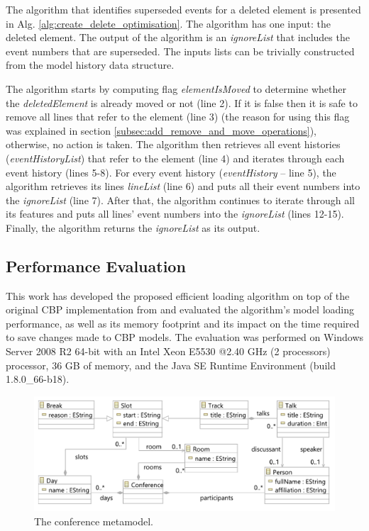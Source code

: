 \documentclass[12pt, a4paper]{report} \usepackage[titletoc]{appendix}
\begin{document}
The algorithm that identifies superseded events for a deleted element is presented in Alg. \ref{alg:create_delete_optimisation}. The algorithm has one input: the deleted element. The output of the algorithm is an \emph{ignoreList} that includes the event numbers that are superseded. The inputs lists can be trivially constructed from the model history data structure.

The algorithm starts by computing flag \emph{elementIsMoved} to determine whether the \emph{deletedElement} is already moved or not (line 2).
If it is false then it is safe to remove all lines that refer to the element (line 3) (the reason for using this flag was explained in section \ref{subsec:add_remove_and_move_operations}), otherwise, no action is taken. The algorithm then retrieves all event histories (\emph{eventHistoryList}) that refer to the element (line 4) and iterates through each event history (lines 5-8). For every event history (\emph{eventHistory} -- line 5), the algorithm retrieves its lines \emph{lineList} (line 6) and puts all their event numbers into the \emph{ignoreList} (line 7). After that, the algorithm continues to iterate through all its features and puts all lines' event numbers into the \emph{ignoreList} (lines 12-15). Finally, the algorithm returns the \emph{ignoreList} as its output.

\subsection{Performance Evaluation}
\label{subsec:performance_evaluation}
This work has developed the proposed efficient loading algorithm on top of the original CBP implementation from \cite{yohannis2017turning} and evaluated the algorithm's model loading performance, as well as its memory footprint and its impact on the time required to save changes made to CBP models. The evaluation was performed on Windows Server 2008 R2 64-bit with an Intel Xeon E5530 @2.40 GHz (2 processors) processor, 36 GB of memory, and the Java SE Runtime Environment (build 1.8.0\_66-b18).

\begin{figure}[htbp]
	\centering
	\includegraphics[width=0.9\linewidth]{conference_metamodel}
	\caption{The conference metamodel.}   
	\label{fig:node_metamodel}
\end{figure}
\end{document}
